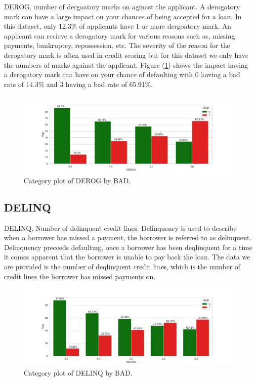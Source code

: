 DEROG, number of dergoatory marks on aginast the applicant. A derogatory mark can have a large impact on your chances of being accepted for a loan. In this dataset, only 12.3\% of applicants have 1 or more dergoatory mark. An applicant can recieve a derogatory mark for various reasons such as, missing payments, bankruptcy, repossession, etc. The severity of the reason for the derogatory mark is often used in credit scoring but for this dataset we only have the numbers of marks against the applicant. Figure (\ref{derog_cat}) shows the impact having a derogatory mark can have on your chance of defaulting with 0 having a bad rate of 14.3\% and 3 having a bad rate of 65.91\%.

\begin{figure}[!ht]
	\centering
	\includegraphics[scale=0.40]{figs/derog_cat.pdf}
	\caption{Category plot of DEROG by BAD. \label{derog_cat}}
\end{figure}

\subsection*{DELINQ}

DELINQ, Number of delinquent credit lines. Delinquency is used to describe when a borrower has missed a payment, the borrower is referred to as delinquent. Delinquency preceeds defaulting, once a borrower has been deqlinquent for a time it comes apparent that the borrower is unable to pay back the loan. The data we are provided is the number of deqlinquent credit lines, which is the number of credit lines the borrower has missed payments on. 

\begin{figure}[!ht]
	\centering
	\includegraphics[scale=0.40]{figs/delinq_cat.pdf}
	\caption{Category plot of DELINQ by BAD. \label{delinq_cat}}
\end{figure}

